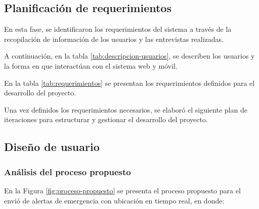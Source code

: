 \subsection{Planificación de requerimientos}
En esta fase, se identificaron los requerimientos del sistema a través de la recopilación de información de los
usuarios y las entrevistas realizadas.
\bigbreak

A continuación, en la tabla \ref{tab:descripcion-usuarios}, se describen los usuarios y la forma en que interactúan con
el sistema web y móvil.



En la tabla \ref{tab:requerimientos} se presentan los requerimientos definidos para el desarrollo del proyecto.



Una vez definidos los requerimientos necesarios, se elaboró el siguiente plan de iteraciones para estructurar y gestionar
el desarrollo del proyecto.



\subsection{Diseño de usuario}

\subsubsection{Análisis del proceso propuesto}

En la Figura \ref{fig:proceso-propuesto} se presenta el proceso propuesto para el envió de alertas de emergencia con
ubicación en tiempo real, en donde:

